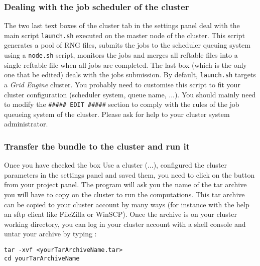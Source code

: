 \subsubsection{Dealing with the job scheduler of the cluster}

The two last text boxes of the cluster tab in the settings panel deal
with the main script \texttt{launch.sh} executed on the master node
of the cluster. This script generates a pool of RNG files, submits
the jobs to the scheduler queuing system using a \texttt{node.sh}
script, monitors the jobs and merges all reftable files into a single
reftable file when all jobs are completed. The last box (which is
the only one that be edited) deals with the jobs submission. By default,
\texttt{launch.sh} targets a \textit{Grid Engine} cluster. You probably
need to customise this script to fit your cluster configuration (scheduler
system, queue name, ...). You should mainly need to modify the \texttt{\#\#\#\#\#
EDIT \#\#\#\#\#} section to comply with the rules of the job queueing
system of the cluster. Please ask for help to your cluster system
administrator.


\subsubsection{Transfer the bundle to the cluster and run it}

\label{clusterrun} Once you have checked the box \textsf{Use a cluster
(...)}, configured the cluster parameters in the settings panel and
saved them, you need to click on the 
button from your project panel. The program will ask you the name
of the tar archive you will have to copy on the cluster to run the
computations. This tar archive can be copied to your cluster account
by many ways (for instance with the help an sftp client like FileZilla
or WinSCP). Once the archive is on your cluster working directory,
you can log in your cluster account with a shell console and untar
your archive by typing :\\
\begin{minipage}[c]{0.9\textwidth}%

\begin{lstlisting}
tar -xvf <yourTarArchiveName.tar>
cd yourTarArchiveName
\end{lstlisting}
%
\end{minipage}\\


